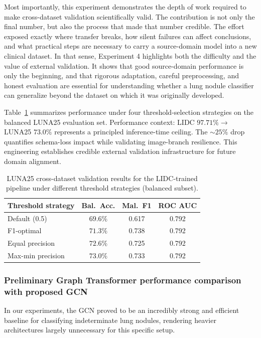 \documentclass[10pt,letterpaper,twocolumn]{article}
\begin{document}
Most importantly, this experiment demonstrates the depth of work required to make cross-dataset validation scientifically valid. The contribution is not only the final number, but also the process that made that number credible. The effort exposed exactly where transfer breaks, how silent failures can affect conclusions, and what practical steps are necessary to carry a source-domain model into a new clinical dataset. In that sense, Experiment 4 highlights both the difficulty and the value of external validation. It shows that good source-domain performance is only the beginning, and that rigorous adaptation, careful preprocessing, and honest evaluation are essential for understanding whether a lung nodule classifier can generalize beyond the dataset on which it was originally developed.

Table~\ref{tab:luna25-thresholds} summarizes performance under four threshold-selection strategies on the balanced LUNA25 evaluation set. Performance context: LIDC $97.71\% \to$ LUNA25 $73.0\%$ represents a principled inference-time ceiling. The $\sim 25\%$ drop quantifies schema-loss impact while validating image-branch resilience. This engineering establishes credible external validation infrastructure for future domain alignment.

\begin{table}[t]
\centering
\caption{LUNA25 cross-dataset validation results for the LIDC-trained pipeline under different threshold strategies (balanced subset).}
\label{tab:luna25-thresholds}
\small
\begin{tabular}{lccc}
\toprule
Threshold strategy & Bal.\ Acc. & Mal.\ F1 & ROC AUC \\
\midrule
Default (0.5)        & $69.6\%$ & 0.617 & 0.792 \\
F1-optimal           & $71.3\%$ & 0.738 & 0.792 \\
Equal precision      & $72.6\%$ & 0.725 & 0.792 \\
Max-min precision    & $73.0\%$ & 0.733 & 0.792 \\
\bottomrule
\end{tabular}
\end{table}

\subsubsection{Preliminary Graph Transformer performance comparison with proposed GCN}

In our experiments, the GCN proved to be an incredibly strong and efficient baseline for classifying indeterminate lung nodules, rendering heavier architectures largely unnecessary for this specific setup.
\end{document}
